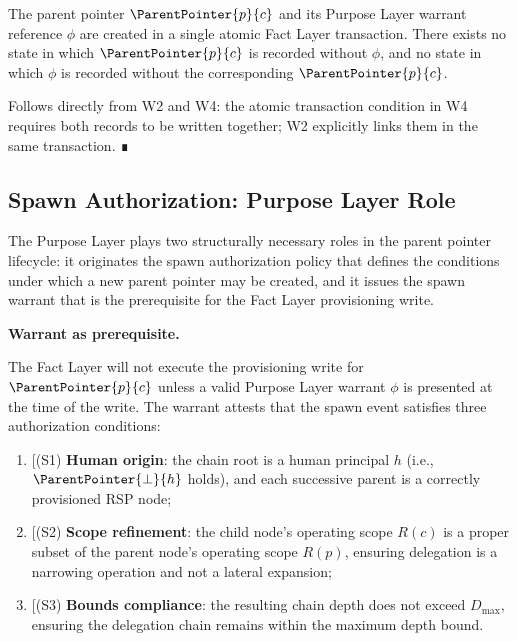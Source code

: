 \begin{prop}
\label{prop:atomic-pointer-warrant}
The parent pointer $\ParentPointer{p}{c}$ and its Purpose Layer warrant reference $\phi$ are created in a single atomic Fact Layer transaction. There exists no state in which $\ParentPointer{p}{c}$ is recorded without $\phi$, and no state in which $\phi$ is recorded without the corresponding $\ParentPointer{p}{c}$.
\end{prop}
\begin{pf}
Follows directly from W2 and W4: the atomic transaction condition in W4 requires both records to be written together; W2 explicitly links them in the same transaction. ∎
\end{pf}

\subsection{Spawn Authorization: Purpose Layer Role}
\label{sec:purpose-layer-authorization}

The Purpose Layer plays two structurally necessary roles in the parent pointer lifecycle: it originates the spawn authorization policy that defines the conditions under which a new parent pointer may be created, and it issues the spawn warrant that is the prerequisite for the Fact Layer provisioning write.

\medskip
\noindent\textbf{Warrant as prerequisite.}

The Fact Layer will not execute the provisioning write for $\ParentPointer{p}{c}$ unless a valid Purpose Layer warrant $\phi$ is presented at the time of the write. The warrant attests that the spawn event satisfies three authorization conditions:

\begin{enumerate}
    \item[(S1) \textbf{Human origin}: the chain root is a human principal $h$ (i.e., $\ParentPointer{\bot}{h}$ holds), and each successive parent is a correctly provisioned RSP node;

    \item[(S2) \textbf{Scope refinement}: the child node's operating scope $R(c)$ is a proper subset of the parent node's operating scope $R(p)$, ensuring delegation is a narrowing operation and not a lateral expansion;

    \item[(S3) \textbf{Bounds compliance}: the resulting chain depth does not exceed $D_{\max}$, ensuring the delegation chain remains within the maximum depth bound.
\end{enumerate}

